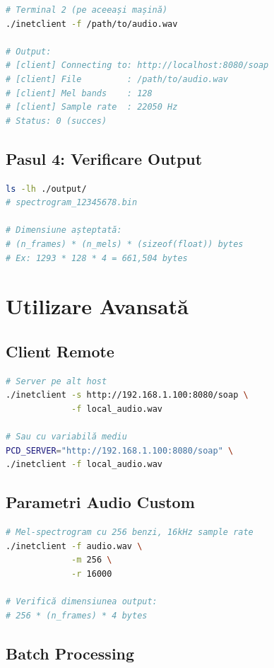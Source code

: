 \documentclass[12pt,a4paper,oneside]{book}
\begin{document}
\begin{lstlisting}[language=bash]
# Terminal 2 (pe aceeași mașină)
./inetclient -f /path/to/audio.wav

# Output:
# [client] Connecting to: http://localhost:8080/soap
# [client] File         : /path/to/audio.wav
# [client] Mel bands    : 128
# [client] Sample rate  : 22050 Hz
# Status: 0 (succes)
\end{lstlisting}

\subsection{Pasul 4: Verificare Output}

\begin{lstlisting}[language=bash]
ls -lh ./output/
# spectrogram_12345678.bin

# Dimensiune așteptată:
# (n_frames) * (n_mels) * (sizeof(float)) bytes
# Ex: 1293 * 128 * 4 = 661,504 bytes
\end{lstlisting}

\section{Utilizare Avansată}

\subsection{Client Remote}

\begin{lstlisting}[language=bash]
# Server pe alt host
./inetclient -s http://192.168.1.100:8080/soap \
             -f local_audio.wav

# Sau cu variabilă mediu
PCD_SERVER="http://192.168.1.100:8080/soap" \
./inetclient -f local_audio.wav
\end{lstlisting}

\subsection{Parametri Audio Custom}

\begin{lstlisting}[language=bash]
# Mel-spectrogram cu 256 benzi, 16kHz sample rate
./inetclient -f audio.wav \
             -m 256 \
             -r 16000

# Verifică dimensiunea output:
# 256 * (n_frames) * 4 bytes
\end{lstlisting}

\subsection{Batch Processing}
\end{document}
